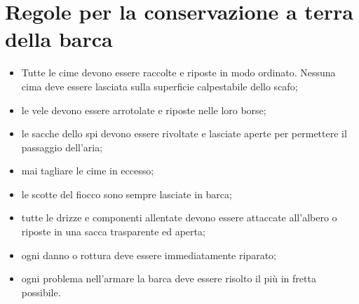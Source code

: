 \section{Regole per la conservazione a terra della barca}
\label{sec:RegolePerLaConservazioneATerraDellaBarca}
\begin{itemize}
    \item Tutte le cime devono essere raccolte e riposte in modo ordinato.
          Nessuna cima deve essere lasciata sulla superficie calpestabile dello
          scafo;
    \item le vele devono essere arrotolate e riposte nelle loro borse;
    \item le sacche dello spi devono essere rivoltate e lasciate aperte per
          permettere il passaggio dell'aria;
    \item mai tagliare le cime in eccesso;
    \item le scotte del fiocco sono sempre lasciate in barca;
    \item tutte le drizze e componenti allentate devono essere attaccate
          all'albero o riposte in una sacca trasparente ed aperta;
    \item ogni danno o rottura deve essere immediatamente riparato;
    \item ogni problema nell'armare la barca deve essere risolto il più in
          fretta possibile.
\end{itemize}